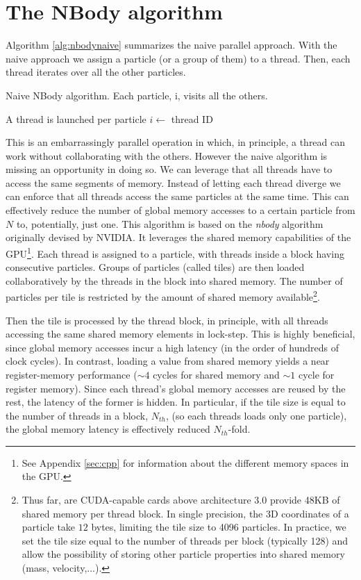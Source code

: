 \documentclass[twoside,openright,titlepage,numbers=noenddot,%
headinclude,footinclude,cleardoublepage=empty,abstract=on,
BCOR=5mm,fontsize=11pt, dvipsnames, paper=b5
]{scrreprt}
\newcommand{\gpu}{\gls{GPU}\xspace}
\begin{document}
\section{The NBody algorithm}
Algorithm \ref{alg:nbodynaive} summarizes the naive parallel approach. With the naive approach we assign a particle (or a group of them) to a thread. Then, each thread iterates over all the other particles.
\begin{algorithm}[H]
  \caption[ ]{Naive NBody algorithm. Each particle, i, visits all the others.}\label{alg:nbodynaive}
  \begin{algorithmic}[1]
    \Require A thread is launched per particle    
    \State $i \gets$ thread ID 
    \EndFor
  \end{algorithmic}
\end{algorithm}
This is an embarrassingly parallel operation in which, in principle, a thread can work without collaborating with the others. However the naive algorithm is missing an opportunity in doing so. We can leverage that all threads have to access the same segments of memory. Instead of letting each thread diverge we can enforce that all threads access the same particles at the same time. This can effectively reduce the number of global memory accesses to a certain particle from $N$ to, potentially, just one.
This algorithm is based on the \emph{nbody} algorithm originally devised by NVIDIA\cite{Nguyen2008,Wilt2013}. It leverages the shared memory capabilities of the \gpu\footnote{See Appendix \ref{sec:cpp} for information about the different memory spaces in the \gpu.}.
Each thread is assigned to a particle, with threads inside a block having consecutive particles.
Groups of particles (called tiles) are then loaded collaboratively by the threads in the block into shared memory.
The number of particles per tile is restricted by the amount of shared memory available\footnote{Thus far, are CUDA-capable cards above architecture 3.0 provide 48KB of shared memory per thread block. In single precision, the 3D coordinates of a particle take $12$ bytes, limiting the tile size to 4096 particles. In practice, we set the tile size equal to the number of threads per block (typically 128) and allow the possibility of storing other particle properties into shared memory (mass, velocity,...).}.

Then the tile is processed by the thread block, in principle, with all threads accessing the same shared memory elements in lock-step.
This is highly beneficial, since global memory accesses incur a high latency (in the order of hundreds of clock cycles). In contrast, loading a value from shared memory yields a near register-memory performance ($\sim 4$ cycles for shared memory and $\sim 1$ cycle for register memory). Since each thread's global memory accesses are reused by the rest, the latency of the former is hidden. In particular, if the tile size is equal to the number of threads in a block, $N_{th}$, (so each threads loads only one particle), the global memory latency is effectively reduced $N_{th}$-fold.
\end{document}
